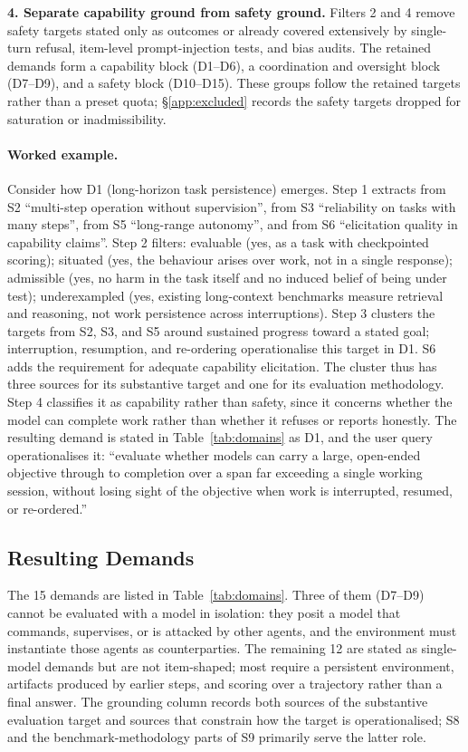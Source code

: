 \documentclass{article} %
\begin{document}
	\textbf{4. Separate capability ground from safety ground.} Filters 2 and 4 remove safety targets stated only as outcomes or already covered extensively by single-turn refusal, item-level prompt-injection tests, and bias audits. The retained demands form a capability block (D1--D6), a coordination and oversight block (D7--D9), and a safety block (D10--D15). These groups follow the retained targets rather than a preset quota; \S\ref{app:excluded} records the safety targets dropped for saturation or inadmissibility.
	
	\paragraph{Worked example.} Consider how D1 (long-horizon task persistence) emerges. Step 1 extracts from S2 ``multi-step operation without supervision'', from S3 ``reliability on tasks with many steps'', from S5 ``long-range autonomy'', and from S6 ``elicitation quality in capability claims''. Step 2 filters: evaluable (yes, as a task with checkpointed scoring); situated (yes, the behaviour arises over work, not in a single response); admissible (yes, no harm in the task itself and no induced belief of being under test); underexampled (yes, existing long-context benchmarks measure retrieval and reasoning, not work persistence across interruptions). Step 3 clusters the targets from S2, S3, and S5 around sustained progress toward a stated goal; interruption, resumption, and re-ordering operationalise this target in D1. S6 adds the requirement for adequate capability elicitation. The cluster thus has three sources for its substantive target and one for its evaluation methodology. Step 4 classifies it as capability rather than safety, since it concerns whether the model can complete work rather than whether it refuses or reports honestly. The resulting demand is stated in Table~\ref{tab:domains} as D1, and the user query operationalises it: ``evaluate whether models can carry a large, open-ended objective through to completion over a span far exceeding a single working session, without losing sight of the objective when work is interrupted, resumed, or re-ordered.''
	
	\subsection{Resulting Demands}
	
	The 15 demands are listed in Table~\ref{tab:domains}. Three of them (D7--D9) cannot be evaluated with a model in isolation: they posit a model that commands, supervises, or is attacked by other agents, and the environment must instantiate those agents as counterparties. The remaining 12 are stated as single-model demands but are not item-shaped; most require a persistent environment, artifacts produced by earlier steps, and scoring over a trajectory rather than a final answer. The grounding column records both sources of the substantive evaluation target and sources that constrain how the target is operationalised; S8 and the benchmark-methodology parts of S9 primarily serve the latter role.
	
\end{document}
